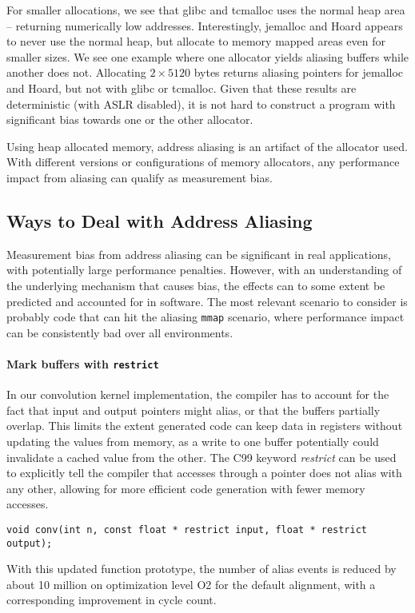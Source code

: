 \documentclass[prodmode,acmtaco]{acmsmall}
\begin{document}
{For smaller allocations, we see that glibc and tcmalloc uses the normal heap area -- returning numerically low addresses.
Interestingly, jemalloc and Hoard appears to never use the normal heap, but allocate to memory mapped areas even for smaller sizes.
We see one example where one allocator yields aliasing buffers while another does not.
Allocating $2 \times 5120$ bytes returns aliasing pointers for jemalloc and Hoard, but not with glibc or tcmalloc.
Given that these results are deterministic (with ASLR disabled), it is not hard to construct a program with significant bias towards one or the other allocator.

Using heap allocated memory, address aliasing is an artifact of the allocator used.
With different versions or configurations of memory allocators, any performance impact from aliasing can qualify as measurement bias.



\subsection{Ways to Deal with Address Aliasing}
Measurement bias from address aliasing can be significant in real applications, with potentially large performance penalties.
However, with an understanding of the underlying mechanism that causes bias, the effects can to some extent be predicted and accounted for in software.
The most relevant scenario to consider is probably code that can hit the aliasing \texttt{mmap} scenario, where performance impact can be consistently bad over all environments.

\paragraph{Mark buffers with \texttt{restrict}}
In our convolution kernel implementation, the compiler has to account for the fact that input and output pointers might alias, or that the buffers partially overlap.
This limits the extent generated code can keep data in registers without updating the values from memory, as a write to one buffer potentially could invalidate a cached value from the other.
The C99 keyword \emph{restrict} can be used to explicitly tell the compiler that accesses through a pointer does not alias with any other, allowing for more efficient code generation with fewer memory accesses.
\begin{lstlisting}[breaklines=true]
    void conv(int n, const float * restrict input, float * restrict output);
\end{lstlisting}
With this updated function prototype, the number of alias events is reduced by about 10 million on optimization level O2 for the default alignment, with a corresponding improvement in cycle count. %

}
\end{document}
